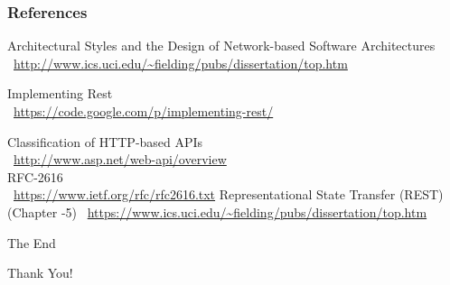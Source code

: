 \documentclass{beamer}
\begin{document}
\begin{frame}
\frametitle{References}
Architectural Styles and the Design of Network-based Software Architectures\\
\ \url{http://www.ics.uci.edu/~fielding/pubs/dissertation/top.htm}

Implementing Rest\\
\ \url{https://code.google.com/p/implementing-rest/}

Classification of HTTP-based APIs\\
\ \url{http://www.asp.net/web-api/overview}
\\RFC-2616\\
\ \url{https://www.ietf.org/rfc/rfc2616.txt}
Representational State Transfer (REST) (Chapter -5)
\ \url{https://www.ics.uci.edu/~fielding/pubs/dissertation/top.htm}

\end{frame}

\begin{frame}
\Huge{\centerline{The End}}

\Huge{\centerline{Thank You!}}
\end{frame}

\end{document}
